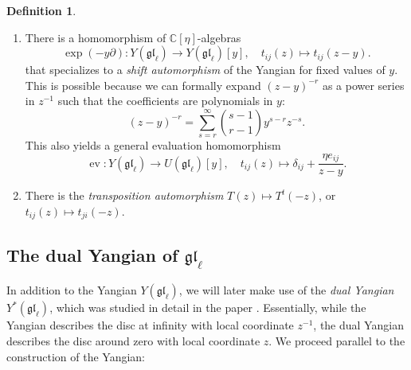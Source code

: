\documentclass[11pt]{report}
\theoremstyle{definition}
\newtheorem{definition}[theorem]{Definition}
\theoremstyle{remark}
\theoremstyle{remark}
\newcommand{\C}{\mathbb{C}}
\begin{document}
\begin{definition}
\begin{enumerate}[label=(\roman*)]
\item There is a homomorphism of $\C[\eta]$-algebras
\begin{equation*}
\exp(-y\partial): Y(\mathfrak{gl}_\ell) \to Y(\mathfrak{gl}_\ell)[y], \quad t_{ij}(z) \mapsto t_{ij}(z-y).
\end{equation*}
that specializes to a \emph{shift automorphism} of the Yangian for fixed values of $y$. This is possible because we can formally expand $(z-y)^{-r}$ as a power series in $z^{-1}$ such that the coefficients are polynomials in $y$:
\begin{equation*}
(z-y)^{-r} = \sum_{s=r}^\infty {s-1 \choose r-1} y^{s-r} z^{-s}.
\end{equation*}
This also yields a general evaluation homomorphism
\begin{equation*}
\operatorname{ev}: Y(\mathfrak{gl}_\ell) \to U(\mathfrak{gl}_\ell)[y], \quad t_{ij}(z) \mapsto \delta_{ij} + \frac{\eta e_{ij}}{z-y}.
\end{equation*}
\item There is the \emph{transposition automorphism} $T(z) \mapsto T^t(-z)$, or $t_{ij}(z) \mapsto t_{ji}(-z)$.
\end{enumerate}
\end{definition}

\subsection{The dual Yangian of $\mathfrak{gl}_\ell$}

In addition to the Yangian $Y(\mathfrak{gl}_\ell)$, we will later make use of the \emph{dual Yangian} $Y^*(\mathfrak{gl}_\ell)$, which was studied in detail in the paper \cite{article:nazarov:2019}. Essentially, while the Yangian describes the disc at infinity with local coordinate $z^{-1}$, the dual Yangian describes the disc around zero with local coordinate $z$. We proceed parallel to the construction of the Yangian:
\end{document}
